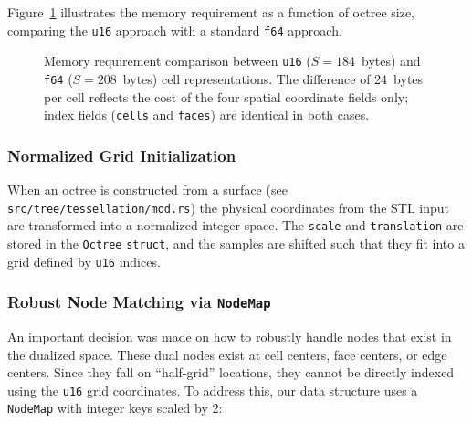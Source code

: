 \documentclass[review,12pt]{elsarticle}
\begin{document}
Figure~\ref{fig:memory_req} illustrates the memory requirement as a function of octree size, comparing the \lstinline!u16! approach with a standard \lstinline!f64! approach.

\begin{figure}[h]
\centering
{}
\caption{Memory requirement comparison between \lstinline!u16! ($S = 184$~bytes) and \lstinline!f64! ($S = 208$~bytes) cell representations. The difference of 24~bytes per cell reflects the cost of the four spatial coordinate fields only; index fields (\lstinline!cells! and \lstinline!faces!) are identical in both cases.}
\label{fig:memory_req}
\end{figure}

\subsubsection{Normalized Grid Initialization}
When an octree is constructed from a surface (see \texttt{src/tree/tessellation/mod.rs}) the physical coordinates from the STL input are transformed into a normalized integer space.
The \lstinline!scale! and \lstinline!translation! are stored in the \lstinline!Octree! \lstinline!struct!, and the
samples are shifted such that they fit into a grid defined by \lstinline!u16! indices.

\subsubsection{Robust Node Matching via \lstinline!NodeMap!}
An important decision was made on how to robustly handle nodes that exist in the dualized
space. These dual nodes exist at cell centers, face centers, or edge centers. 
Since they fall on ``half-grid'' locations, they cannot be directly indexed using the \lstinline!u16! grid coordinates. To address this, our data structure uses a \lstinline!NodeMap! with integer keys scaled by 2:
\end{document}
